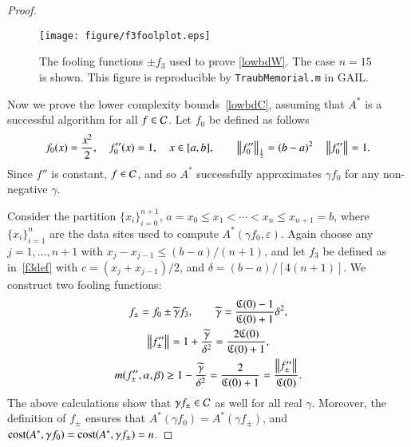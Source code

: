\documentclass[review]{elsarticle}
\newcommand{\abstol}{\varepsilon}
\theoremstyle{definition}
\newcommand{\tgamma}{\widetilde{\gamma}}
\begin{document}
\begin{proof}
\begin{figure}
	\centering
	\texttt{[image: figure/f3foolplot.eps]}
	\caption{The fooling functions $\pm f_3$ used to prove \eqref{lowbdW}. The case
	$n=15$ is shown.  This figure is reproducible by \texttt{TraubMemorial.m}
	in GAIL.}
	\label{f3foolplot}
\end{figure}
	
Now we prove the lower complexity bounds~\eqref{lowbdC}, assuming that $A^*$ is a successful algorithm for all $f  \in \mathcal{C}$.  Let $f_0$ be defined as follows
\begin{equation}
\label{assumpfzero}
f_0(x) =\frac{x^2}{2}, \quad f_0''(x) = 1, \quad x \in [a,b], \qquad \norm[\frac12]{f_0''} = (b -a)^2  \quad \norm{f_0''} = 1.
\end{equation}
Since $f''$ is constant, $f \in \mathcal{C}$, and so $A^*$ successfully approximates $\gamma f_0$ for any non-negative $\gamma$.

Consider the partition $\{x_i\}_{i=0}^{n+1}$, $a=x_0 \le x_1 < \cdots < x_n \le x_{n+1} = b$, where $\{x_i\}_{i=1}^n$ are the data sites used to compute  $A^*(\gamma f_0,\abstol)$.    Again choose any $j=1, \ldots, n+1$ with $x_j-x_{j-1} \le (b-a)/(n+1)$, and let $f_3$ be defined as in~\eqref{f3def} with $c = (x_j+x_{j-1})/2$, and $\delta  = (b-a)/[4(n+1)]$. We construct two fooling functions:
\begin{gather*}
f_{\pm} = f_0 \pm \tgamma f_3, \qquad \tgamma =\frac{\fC(0)-1}{\fC(0)+1}\delta^2, \\
\norm{f''_{\pm}} = 1+\frac{\tgamma}{\delta^2} = \frac{2\fC(0)}{\fC(0)+1} , \\
m(f''_{\pm},\alpha,\beta) \ge 1-\frac{\tgamma}{\delta^2} = \frac{2}{\fC(0)+1} = \frac{\norm{f''_{\pm}} }{\fC(0)}.
\end{gather*}
The above calculations show that $\gamma f_{\pm} \in \mathcal{C}$ as well for all real $\gamma$.  Moreover, the definition of $f_{\pm}$ ensures that
$A^*(\gamma f_0) = A^*(\gamma f_{\pm})$, and $\operatorname{cost}(A^*,\gamma f_0) = \operatorname{cost}(A^*,\gamma f_{\pm}) = n$.


\end{proof}
\end{document}
